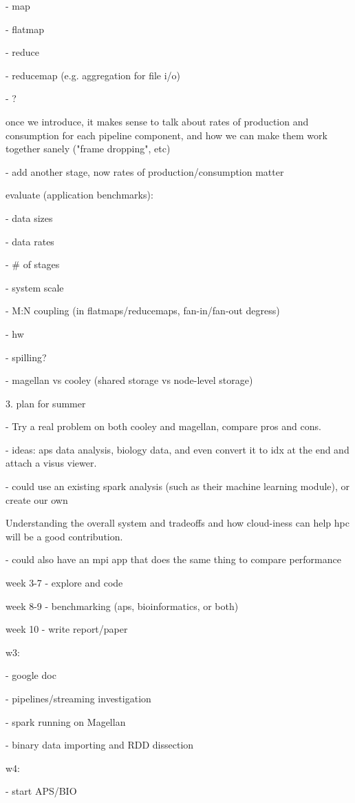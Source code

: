 - map

- flatmap

- reduce

- reducemap (e.g. aggregation for file i/o)

- ?

once we introduce, it makes sense to talk about rates of production and
consumption for each pipeline component, and how we can make them work
together sanely ("frame dropping", etc)

- add another stage, now rates of production/consumption matter

evaluate (application benchmarks):

- data sizes

- data rates

- \# of stages

- system scale

- M:N coupling (in flatmaps/reducemaps, fan-in/fan-out degress)

- hw

- spilling?

- magellan vs cooley (shared storage vs node-level storage)

3. plan for summer

- Try a real problem on both cooley and magellan, compare pros and cons.

- ideas: aps data analysis, biology data, and even convert it to idx at
the end and attach a visus viewer.

- could use an existing spark analysis (such as their machine learning
module), or create our own

Understanding the overall system and tradeoffs and how cloud-iness can
help hpc will be a good contribution.

- could also have an mpi app that does the same thing to compare
performance

week 3-7 - explore and code

week 8-9 - benchmarking (aps, bioinformatics, or both)

week 10 - write report/paper

w3:

- google doc

- pipelines/streaming investigation

- spark running on Magellan

- binary data importing and RDD dissection

w4:

- start APS/BIO

